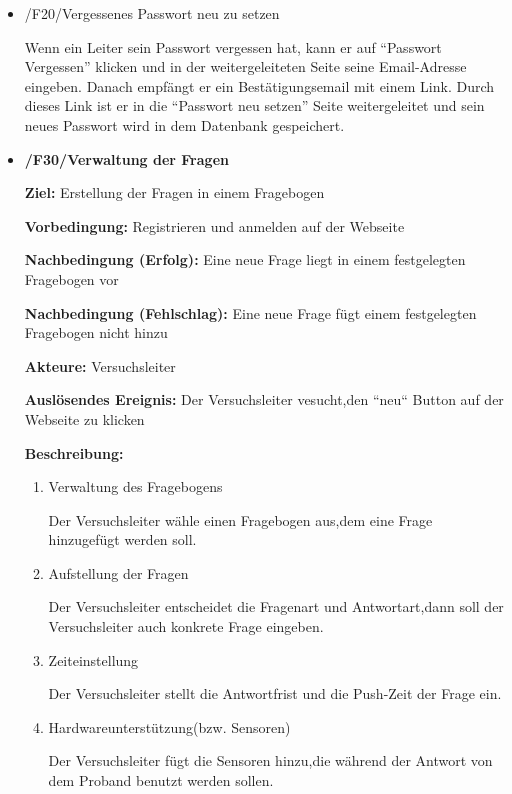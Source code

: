 \documentclass[a4paper]{scrreprt}
\begin{document}
\begin{itemize}
	            \item /F20/Vergessenes Passwort neu zu setzen
	            	\par Wenn ein Leiter sein Passwort vergessen hat, kann er auf “Passwort Vergessen” klicken und in der weitergeleiteten Seite seine Email-Adresse eingeben. Danach empfängt er ein Bestätigungsemail mit einem Link. Durch dieses Link ist er in die “Passwort neu setzen” Seite weitergeleitet und sein neues Passwort wird in dem Datenbank gespeichert.

	            \item \textbf{/F30/Verwaltung der Fragen }
	            	\par \textbf{Ziel: }Erstellung der Fragen in einem Fragebogen
	            	\par \textbf{Vorbedingung: } Registrieren und anmelden auf der Webseite
	            	\par \textbf{Nachbedingung (Erfolg): }Eine neue Frage liegt in einem festgelegten Fragebogen vor
	            	\par \textbf{Nachbedingung (Fehlschlag): }Eine neue Frage fügt einem festgelegten Fragebogen nicht hinzu
	            	\par \textbf{Akteure: }Versuchsleiter
	            	\par \textbf{Auslösendes Ereignis: }Der Versuchsleiter vesucht,den “neu“ Button auf der Webseite zu klicken
	            	\par \textbf{Beschreibung: }
		            	\begin{enumerate}
			            	\item Verwaltung des Fragebogens
                            \par Der Versuchsleiter wähle einen Fragebogen aus,dem eine Frage hinzugefügt werden soll.
                            \item Aufstellung der Fragen
                            \par Der Versuchsleiter entscheidet die Fragenart und Antwortart,dann soll der Versuchsleiter auch konkrete Frage eingeben.
                            \item Zeiteinstellung
                            \par Der Versuchsleiter stellt die Antwortfrist und die Push-Zeit der Frage ein.
                            \item Hardwareunterstützung(bzw. Sensoren)
                            \par Der Versuchsleiter fügt die Sensoren hinzu,die während der Antwort von dem Proband benutzt werden sollen.

\end{enumerate}
\end{itemize}
\end{document}
